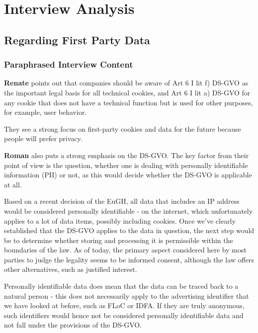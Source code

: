 %
%

\pagebreak
\section{Interview Analysis}

\onehalfspacing

\subsection{Regarding First Party Data}

\subsubsection{Paraphrased Interview Content}

\textbf{Renate} points out that companies should be aware of Art 6 I lit f) DS-GVO as the important legal basis for all technical cookies, and Art 6 I lit a) DS-GVO for any cookie that does not have a technical function but is used for other purposes, for example, user behavior.

They see a strong focus on first-party cookies and data for the future because people will prefer privacy.

\textbf{Roman} also puts a strong emphasis on the DS-GVO. The key factor from their point of view is the question, whether one is dealing with personally identifiable information (PII) or not, as this would decide whether the DS-GVO is applicable at all. 

Based on a recent decision of the EuGH, all data that includes an IP address would be considered personally identifiable - on the internet, which unfortunately applies to a lot of data items, possibly including cookies. Once we've clearly established that the DS-GVO applies to the data in question, the next step would be to determine whether storing and processing it is permissible within the boundaries of the law. As of today, the primary aspect considered here by most parties to judge the legality seems to be informed consent, although the law offers other alternatives, such as justified interest.

Personally identifiable data does mean that the data can be traced back to a natural person - this does not necessarily apply to the advertising identifier that we have looked at before, such as FLoC or IDFA. If they are truly anonymous, such identifiers would hence not be considered personally identifiable data and not fall under the provisions of the DS-GVO.

